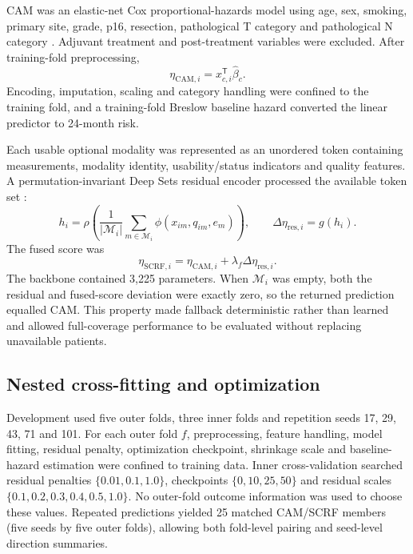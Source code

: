 \documentclass[pdflatex,sn-nature]{sn-jnl}
\begin{document}
CAM was an elastic-net Cox proportional-hazards model using age, sex, smoking, primary site, grade, p16, resection, pathological T category and pathological N category \cite{cox1972,breslow1974}. Adjuvant treatment and post-treatment variables were excluded. After training-fold preprocessing,
\begin{equation}
\eta_{\mathrm{CAM},i}=x_{c,i}^{\mathsf T}\hat\beta_c.
\end{equation}
Encoding, imputation, scaling and category handling were confined to the training fold, and a training-fold Breslow baseline hazard converted the linear predictor to 24-month risk.

Each usable optional modality was represented as an unordered token containing measurements, modality identity, usability/status indicators and quality features. A permutation-invariant Deep Sets residual encoder processed the available token set \cite{zaheer2017,lee2019}:
\begin{equation}
h_i=\rho\left(\frac{1}{|\mathcal{M}_i|}\sum_{m\in\mathcal{M}_i}\phi(x_{im},q_{im},e_m)\right),\qquad
\Delta\eta_{\mathrm{res},i}=g(h_i).
\end{equation}
The fused score was
\begin{equation}
\eta_{\mathrm{SCRF},i}=\eta_{\mathrm{CAM},i}+\lambda_f\Delta\eta_{\mathrm{res},i}.
\end{equation}
The backbone contained 3,225 parameters. When $\mathcal{M}_i$ was empty, both the residual and fused-score deviation were exactly zero, so the returned prediction equalled CAM. This property made fallback deterministic rather than learned and allowed full-coverage performance to be evaluated without replacing unavailable patients.

\subsection{Nested cross-fitting and optimization}
Development used five outer folds, three inner folds and repetition seeds 17, 29, 43, 71 and 101. For each outer fold $f$, preprocessing, feature handling, model fitting, residual penalty, optimization checkpoint, shrinkage scale and baseline-hazard estimation were confined to training data. Inner cross-validation searched residual penalties $\{0.01,0.1,1.0\}$, checkpoints $\{0,10,25,50\}$ and residual scales $\{0.1,0.2,0.3,0.4,0.5,1.0\}$. No outer-fold outcome information was used to choose these values. Repeated predictions yielded 25 matched CAM/SCRF members (five seeds by five outer folds), allowing both fold-level pairing and seed-level direction summaries.
\end{document}

